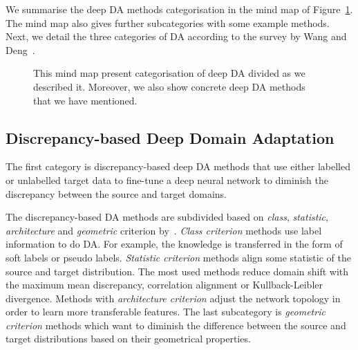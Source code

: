 We summarise the deep DA methods categorisation in the mind map of Figure~\ref{mind_map}.
The mind map also gives further subcategories with some example methods.
Next, we detail the three categories of DA according to the survey by Wang and Deng~\cite{wang2018}.

\begin{figure}
\caption[Mind map of deep domain adaptation]{
	This mind map present categorisation of deep DA divided as we described it.
	Moreover, we also show concrete deep DA methods
	that we have mentioned.
}
\label{mind_map}
\end{figure}

\subsection{Discrepancy-based Deep Domain Adaptation}
\label{discrepancy_da}

The first category is discrepancy-based deep DA methods
that use either labelled or unlabelled target data
to fine-tune a deep neural network to diminish the discrepancy
between the source and target domains.

The discrepancy-based DA methods are subdivided based on \textit{class}, \textit{statistic}, \textit{architecture} and \textit{geometric} criterion by~\cite{wang2018}.
\textit{Class criterion} methods use label information to do DA.
For example, the knowledge is transferred in the form of soft labels or pseudo labels.
\textit{Statistic criterion} methods align some statistic of the source and target distribution.
The most used methods reduce domain shift with the maximum mean discrepancy, correlation alignment or Kullback-Leibler divergence.
Methods with \textit{architecture criterion} adjust the network topology in order to learn more transferable features.
The last subcategory is \textit{geometric criterion} methods
which want to diminish the difference between the source and target distributions based on their geometrical properties.

